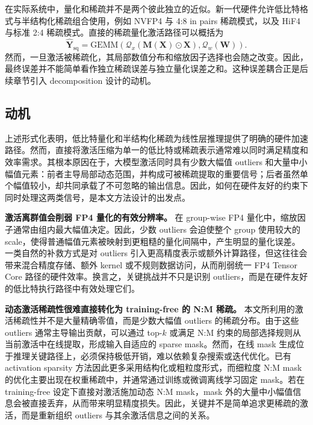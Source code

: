\documentclass{article}
\begin{document}
在实际系统中，量化和稀疏并不是两个彼此独立的近似。新一代硬件允许低比特格式与半结构化稀疏组合使用，例如 NVFP4
与 4:8 in pairs 稀疏模式，以及 HiF4 与标准 2:4 稀疏模式。直接的稀疏量化激活路径可以概括为
\begin{equation}
  \widehat{\mathbf{Y}}_{\mathrm{sq}} =
  \mathrm{GEMM}\left(
    \mathcal{Q}_x(\mathbf{M}(\mathbf{X}) \odot \mathbf{X}),
    \mathcal{Q}_w(\mathbf{W})
  \right).
  \label{eq:direct-sparse-quant}
\end{equation}
然而，一旦激活被稀疏化，其局部数值分布和缩放因子选择也会随之改变。因此，最终误差并不能简单看作独立稀疏误差与独立量化误差之和。这种误差耦合正是后续章节引入 decomposition 设计的动机。

\subsection{动机}

上述形式化表明，低比特量化和半结构化稀疏为线性层推理提供了明确的硬件加速路径。然而，直接将激活压缩为单一的低比特或稀疏表示通常难以同时满足精度和效率需求。其根本原因在于，大模型激活同时具有少数大幅值
outliers 和大量中小幅值元素：前者主导局部动态范围，并构成可被稀疏提取的重要信号；后者虽然单个幅值较小，却共同承载了不可忽略的输出信息。因此，如何在硬件友好的约束下同时处理这两类信号，是本文方法设计的出发点。

\textbf{激活离群值会削弱 FP4 量化的有效分辨率。}
在 group-wise FP4 量化中，缩放因子通常由组内最大幅值决定。因此，少数
outliers 会迫使整个 group 使用较大的 scale，使得普通幅值元素被映射到更粗糙的量化间隔中，产生明显的量化误差。一类自然的补救方式是对
outliers 引入更高精度表示或额外计算路径，但这往往会带来混合精度存储、额外
kernel 或不规则数据访问，从而削弱统一 FP4 Tensor Core 路径的硬件效率。换言之，关键挑战并不只是识别
outliers，而是在硬件友好的低比特执行路径中有效处理它们。

\textbf{动态激活稀疏性很难直接转化为 training-free 的 N:M 稀疏。}
本文所利用的激活稀疏性并不是大量精确零值，而是少数大幅值
outliers 的稀疏分布。由于这些 outliers 通常主导输出贡献，可以通过
top-$k$ 或满足 N:M 约束的局部选择规则从当前激活中在线提取，形成输入自适应的
sparse mask。然而，在线 mask 生成位于推理关键路径上，必须保持极低开销，难以依赖复杂搜索或迭代优化。已有
activation sparsity 方法因此更多采用结构化或粗粒度形式，而细粒度 N:M mask 的优化主要出现在权重稀疏中，并通常通过训练或微调离线学习固定
mask。若在 training-free 设定下直接对激活施加动态 N:M mask，mask
外的大量中小幅值信息会被直接丢弃，从而带来明显精度损失。因此，关键并不是简单追求更稀疏的激活，而是重新组织
outliers 与其余激活信息之间的关系。
\end{document}
